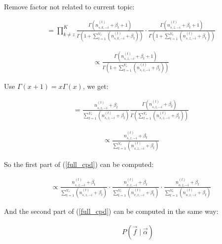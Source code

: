 \documentclass{article}
\begin{document}
Remove factor not related to current topic:

\begin{equation}
\begin{aligned}
&= \prod_{k\neq z}^K \frac{\varGamma(n_{s,k,-i}^{(t)}+\beta_t+1)}{\varGamma(1+\sum_{t=1}^{V_s}(n_{s,k,-i}^{(t)} + \beta_t))}
\cdot \frac{\varGamma(n_{s,z,-i}^{(t)}+\beta_t+1)}{\varGamma(1+\sum_{t=1}^{V_s}(n_{s,z,-i}^{(t)} + \beta_t))}
\end{aligned}
\end{equation}

\begin{equation}
\begin{aligned}
&\propto  \frac{\varGamma(n_{s,z,-i}^{(t)}+\beta_t+1)}{\varGamma(1+\sum_{t=1}^{V_s}(n_{s,z,-i}^{(t)} + \beta_t))}
\end{aligned}
\end{equation}

Use $\varGamma(x+1) = x\varGamma(x)$, we get:

\begin{equation}
\begin{aligned}
&= \frac{n_{s,z,-i}^{(t)}+\beta_t}{\sum_{t=1}^{V_s}(n_{s,z,-i}^{(t)} + \beta_t)} \frac{\varGamma(n_{s,z,-i}^{(t)}+\beta_t)}{\varGamma(\sum_{t=1}^{V_s}(n_{s,z,-i}^{(t)} + \beta_t))}
\end{aligned}
\end{equation}

\begin{equation}
\begin{aligned}
&\propto \frac{n_{s,z,-i}^{(t)}+\beta_t}{\sum_{t=1}^{V_s}(n_{s,z,-i}^{(t)} + \beta_t)}
\end{aligned}
\end{equation}


So the first part of (\ref{full_cpd}) can be computed:

\begin{equation}
\begin{aligned}
&\propto \frac{n_{s,z,-i}^{(t)}+\beta_t}{\sum_{t=1}^{V_s}(n_{s,z,-i}^{(t)} + \beta_t)}
\cdot \frac{n_{v,z,-i}^{(t)}+\beta_t}{\sum_{t=1}^{V_v}(n_{v,z,-i}^{(t)} + \beta_t)}
\cdot \frac{n_{o,z,-i}^{(t)}+\beta_t}{\sum_{t=1}^{V_o}(n_{o,z,-i}^{(t)} + \beta_t)}
\end{aligned}
\end{equation}


And the second part of (\ref{full_cpd}) can be computed in the same way:

\begin{equation}
\begin{aligned}
& \qquad P(\vec{f} \mid \vec{\alpha})
\end{aligned}
\end{equation}
\end{document}

